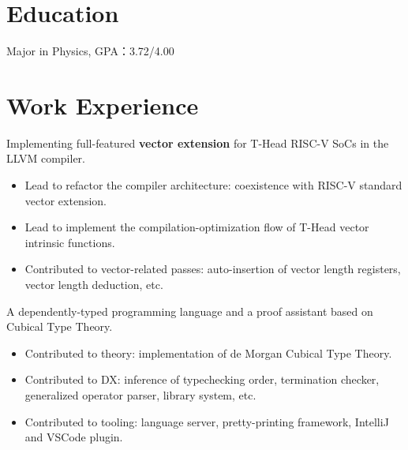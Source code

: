 \documentclass{resume}
\begin{document}
\renewcommand\headrulewidth{0pt}



\section{Education}
  Major in Physics, GPA：3.72/4.00

\section{Work Experience}

\begin{addmargin}[0.8em]{0em}
  Implementing full-featured \textbf{vector extension} for T-Head RISC-V SoCs in the LLVM compiler.
  \begin{itemize}
    \item Lead to refactor the compiler architecture: coexistence with RISC-V standard vector extension.
    \item Lead to implement the compilation-optimization flow of T-Head vector intrinsic functions.
    \item Contributed to vector-related passes: auto-insertion of vector length registers, vector length deduction, etc.
  \end{itemize}
\end{addmargin}

\begin{addmargin}[0.8em]{0em}
  A dependently-typed programming language and a proof assistant based on Cubical Type Theory.
  \begin{itemize}
    \item Contributed to theory: implementation of de Morgan Cubical Type Theory.
    \item Contributed to DX: inference of typechecking order, termination checker, generalized operator parser, library system, etc.
    \item Contributed to tooling: language server, pretty-printing framework, IntelliJ and VSCode plugin.
  \end{itemize}
\end{addmargin}
\end{document}
